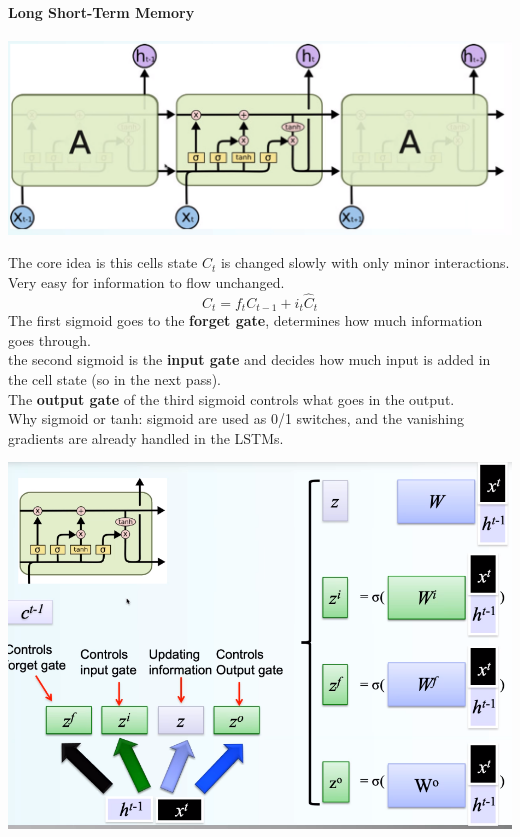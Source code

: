 \documentclass[10pt]{report}
\begin{document}
\paragraph{Long Short-Term Memory}
\begin{center}
	\includegraphics[scale=0.5]{31.png}
\end{center}
The core idea is this cells state $C_t$ is changed slowly with only minor interactions. Very easy for information to flow unchanged.
$$C_t = f_tC_{t-1}+i_t\hat{C}_t$$
The first sigmoid goes to the \textbf{forget gate}, determines how much information goes through.\\
the second sigmoid is the \textbf{input gate} and decides how much input is added in the cell state (so in the next pass).\\
The \textbf{output gate} of the third sigmoid controls what goes in the output.\\
Why sigmoid or tanh: sigmoid are used as 0/1 switches, and the vanishing gradients are already handled in the LSTMs.
\begin{center}
	\includegraphics[scale=0.5]{32.png}
\end{center}
\end{document}
